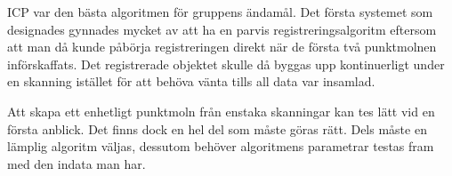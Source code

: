 ICP var den bästa algoritmen för gruppens ändamål. Det första systemet som designades gynnades mycket av att ha en parvis registreringsalgoritm eftersom att man då kunde påbörja registreringen direkt när de första två punktmolnen införskaffats. Det registrerade objektet skulle då byggas upp kontinuerligt under en skanning istället för att behöva vänta tills all data var insamlad.

Att skapa ett enhetligt punktmoln från enstaka skanningar kan tes lätt vid en första anblick. Det finns dock en hel del som måste göras rätt. Dels måste en lämplig algoritm väljas, dessutom behöver algoritmens parametrar testas fram med den indata man har. 



